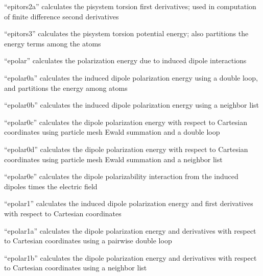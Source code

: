 \documentclass[letterpaper,11pt,english]{sphinxmanual}
\begin{document}

“epitors2a” calculates the pi\sphinxhyphen{}system torsion first derivatives;
used in computation of finite difference second derivatives


“epitors3” calculates the pi\sphinxhyphen{}system torsion potential energy;
also partitions the energy terms among the atoms


“epolar” calculates the polarization energy due to induced
dipole interactions


“epolar0a” calculates the induced dipole polarization energy
using a double loop, and partitions the energy among atoms


“epolar0b” calculates the induced dipole polarization energy
using a neighbor list


“epolar0c” calculates the dipole polarization energy with respect
to Cartesian coordinates using particle mesh Ewald summation and
a double loop


“epolar0d” calculates the dipole polarization energy with respect
to Cartesian coordinates using particle mesh Ewald summation and
a neighbor list


“epolar0e” calculates the dipole polarizability interaction
from the induced dipoles times the electric field


“epolar1” calculates the induced dipole polarization energy
and first derivatives with respect to Cartesian coordinates


“epolar1a” calculates the dipole polarization energy and
derivatives with respect to Cartesian coordinates using a
pairwise double loop


“epolar1b” calculates the dipole polarization energy and
derivatives with respect to Cartesian coordinates using a
neighbor list
\end{document}

